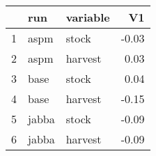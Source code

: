 \begin{table}[ht]
\centering
\begin{tabular}{rllr}
  \hline
 & run & variable & V1 \\ 
  \hline
1 & aspm & stock & -0.03 \\ 
  2 & aspm & harvest & 0.03 \\ 
  3 & base & stock & 0.04 \\ 
  4 & base & harvest & -0.15 \\ 
  5 & jabba & stock & -0.09 \\ 
  6 & jabba & harvest & -0.09 \\ 
   \hline
\end{tabular}
\end{table}
